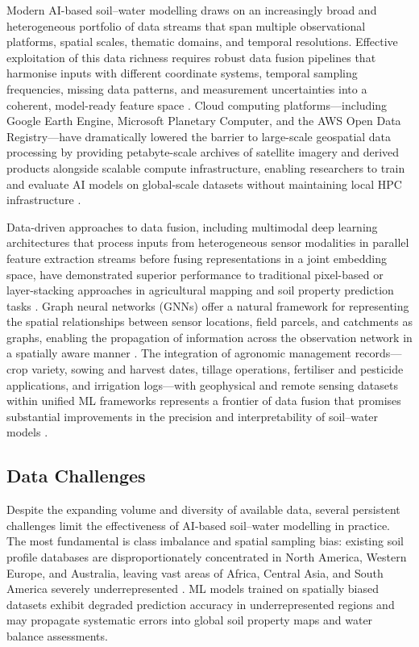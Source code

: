 \documentclass[land,article,submit,pdftex,moreauthors]{Definitions/mdpi}
\numberwithin{equation}{section}
\begin{document}
Modern AI-based soil--water modelling draws on an increasingly broad and heterogeneous portfolio of data streams that span multiple observational platforms, spatial scales, thematic domains, and temporal resolutions. Effective exploitation of this data richness requires robust data fusion pipelines that harmonise inputs with different coordinate systems, temporal sampling frequencies, missing data patterns, and measurement uncertainties into a coherent, model-ready feature space \citep{reichstein2019deep}. Cloud computing platforms---including Google Earth Engine, Microsoft Planetary Computer, and the AWS Open Data Registry---have dramatically lowered the barrier to large-scale geospatial data processing by providing petabyte-scale archives of satellite imagery and derived products alongside scalable compute infrastructure, enabling researchers to train and evaluate AI models on global-scale datasets without maintaining local HPC infrastructure \citep{gorelick2017google}.

Data-driven approaches to data fusion, including multimodal deep learning architectures that process inputs from heterogeneous sensor modalities in parallel feature extraction streams before fusing representations in a joint embedding space, have demonstrated superior performance to traditional pixel-based or layer-stacking approaches in agricultural mapping and soil property prediction tasks \citep{hong2021multimodal}. Graph neural networks (GNNs) offer a natural framework for representing the spatial relationships between sensor locations, field parcels, and catchments as graphs, enabling the propagation of information across the observation network in a spatially aware manner \citep{xu2021graph}. The integration of agronomic management records---crop variety, sowing and harvest dates, tillage operations, fertiliser and pesticide applications, and irrigation logs---with geophysical and remote sensing datasets within unified ML frameworks represents a frontier of data fusion that promises substantial improvements in the precision and interpretability of soil--water models \citep{liakos2018machine}.

\subsection{Data Challenges}

Despite the expanding volume and diversity of available data, several persistent challenges limit the effectiveness of AI-based soil--water modelling in practice. The most fundamental is class imbalance and spatial sampling bias: existing soil profile databases are disproportionately concentrated in North America, Western Europe, and Australia, leaving vast areas of Africa, Central Asia, and South America severely underrepresented \citep{hengl2017soilgrids250m}. ML models trained on spatially biased datasets exhibit degraded prediction accuracy in underrepresented regions and may propagate systematic errors into global soil property maps and water balance assessments.
\end{document}
